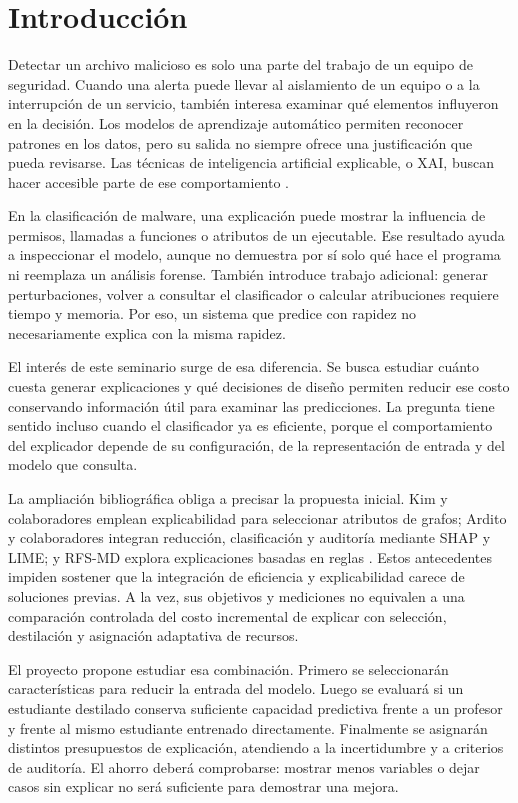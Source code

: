 \chapter{Introducción}
Detectar un archivo malicioso es solo una parte del trabajo de un equipo de seguridad. Cuando una alerta puede llevar al aislamiento de un equipo o a la interrupción de un servicio, también interesa examinar qué elementos influyeron en la decisión. Los modelos de aprendizaje automático permiten reconocer patrones en los datos, pero su salida no siempre ofrece una justificación que pueda revisarse. Las técnicas de inteligencia artificial explicable, o XAI, buscan hacer accesible parte de ese comportamiento \parencite{Manthena2025,Liu2025GlassBox}.

En la clasificación de malware, una explicación puede mostrar la influencia de permisos, llamadas a funciones o atributos de un ejecutable. Ese resultado ayuda a inspeccionar el modelo, aunque no demuestra por sí solo qué hace el programa ni reemplaza un análisis forense. También introduce trabajo adicional: generar perturbaciones, volver a consultar el clasificador o calcular atribuciones requiere tiempo y memoria. Por eso, un sistema que predice con rapidez no necesariamente explica con la misma rapidez.

El interés de este seminario surge de esa diferencia. Se busca estudiar cuánto cuesta generar explicaciones y qué decisiones de diseño permiten reducir ese costo conservando información útil para examinar las predicciones. La pregunta tiene sentido incluso cuando el clasificador ya es eficiente, porque el comportamiento del explicador depende de su configuración, de la representación de entrada y del modelo que consulta.

La ampliación bibliográfica obliga a precisar la propuesta inicial. Kim y colaboradores emplean explicabilidad para seleccionar atributos de grafos; Ardito y colaboradores integran reducción, clasificación y auditoría mediante SHAP y LIME; y RFS-MD explora explicaciones basadas en reglas \parencite{Kim2026FCG,Ardito2026Hybrid,Alhawari2026RFSMD}. Estos antecedentes impiden sostener que la integración de eficiencia y explicabilidad carece de soluciones previas. A la vez, sus objetivos y mediciones no equivalen a una comparación controlada del costo incremental de explicar con selección, destilación y asignación adaptativa de recursos.

El proyecto propone estudiar esa combinación. Primero se seleccionarán características para reducir la entrada del modelo. Luego se evaluará si un estudiante destilado conserva suficiente capacidad predictiva frente a un profesor y frente al mismo estudiante entrenado directamente. Finalmente se asignarán distintos presupuestos de explicación, atendiendo a la incertidumbre y a criterios de auditoría. El ahorro deberá comprobarse: mostrar menos variables o dejar casos sin explicar no será suficiente para demostrar una mejora.

